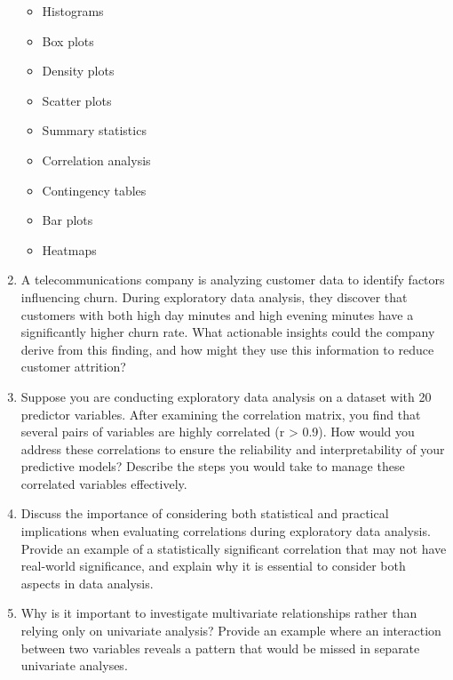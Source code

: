 \documentclass[
]{book}
\providecommand{\tightlist}{%
  \setlength{\itemsep}{0pt}\setlength{\parskip}{0pt}}
\theoremstyle{definition}
\theoremstyle{definition}
\theoremstyle{definition}
\theoremstyle{definition}
\theoremstyle{remark}
\begin{document}
\begin{enumerate}
  \begin{itemize}
  \tightlist
  \item
    Histograms\\
  \item
    Box plots\\
  \item
    Density plots\\
  \item
    Scatter plots\\
  \item
    Summary statistics\\
  \item
    Correlation analysis\\
  \item
    Contingency tables\\
  \item
    Bar plots\\
  \item
    Heatmaps
  \end{itemize}
\item
  A telecommunications company is analyzing customer data to identify factors influencing churn. During exploratory data analysis, they discover that customers with both high day minutes and high evening minutes have a significantly higher churn rate. What actionable insights could the company derive from this finding, and how might they use this information to reduce customer attrition?
\item
  Suppose you are conducting exploratory data analysis on a dataset with 20 predictor variables. After examining the correlation matrix, you find that several pairs of variables are highly correlated (r \textgreater{} 0.9). How would you address these correlations to ensure the reliability and interpretability of your predictive models? Describe the steps you would take to manage these correlated variables effectively.
\item
  Discuss the importance of considering both statistical and practical implications when evaluating correlations during exploratory data analysis. Provide an example of a statistically significant correlation that may not have real-world significance, and explain why it is essential to consider both aspects in data analysis.
\item
  Why is it important to investigate multivariate relationships rather than relying only on univariate analysis? Provide an example where an interaction between two variables reveals a pattern that would be missed in separate univariate analyses.

\end{enumerate}
\end{document}
